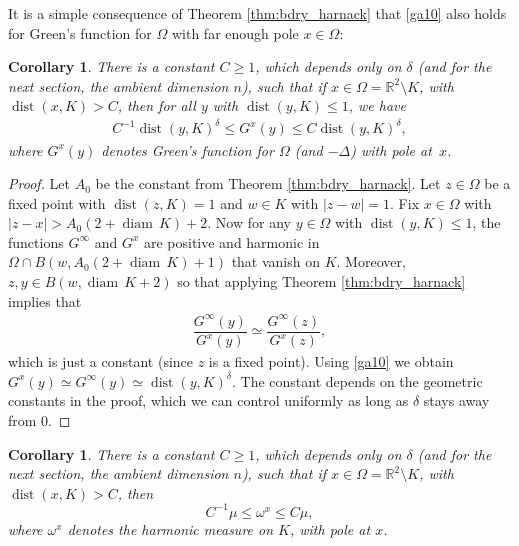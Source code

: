 \documentclass[JEP,XML,SOM,Unicode,published]{cedram}
\let\sm\setminus
\numberwithin{equation}{section}
\theoremstyle{plain}
\newtheorem{cor}[lem]{Corollary}
\theoremstyle{definition}
\newcommand{\R}{\mathbb{R}}
\let\sm\setminus
\DeclareMathOperator{\dist}{dist}
\newcommand{\R}{\mathbb{R}}
\DeclareMathOperator{\dist}{dist}
\DeclareMathOperator{\diam}{diam}
\begin{document}
It is a simple consequence of Theorem \ref{thm:bdry_harnack} that \eqref{ga10} also
holds for Green's function for $\Omega$ with far enough pole $x \in \Omega$:

\begin{cor}\label{cor:finite_pole}
There is a constant $C \geq 1$, which depends only on $\delta$
(and for the next section, the ambient dimension $n$), such that if
$x \in \Omega = \R^2 \sm K$, with $\dist(x, K) > C$, then for
all $y$ with $\dist(y,K) \le 1$, we have\vspace*{-3pt}
\begin{align*}
C^{-1} \dist(y, K)^\delta \leq G^x(y) \leq C \dist(y, K)^\delta,
\end{align*}
where $G^x(y)$ denotes Green's %
function for $\Omega$ (and $-\Delta$) with pole at~$x$.
\end{cor}

\begin{proof}
Let $A_0$ be the constant from Theorem \ref{thm:bdry_harnack}.
Let $z \in \Omega$ be a fixed point with $\dist(z, K) = 1$ and $w \in K$ with $|z- w| = 1$.
Fix $x \in \Omega$ with $|z - x| > A_0(2 + \diam \, K) + 2$.
Now for any $y \in \Omega$ with $\dist(y, K) \le 1$,
the functions $G^\infty$ and $G^x$ are positive and harmonic in $\Omega \cap B(w, A_0(2+\diam \, K) + 1)$ that vanish on $K$. Moreover, $z, y \in B(w, \diam \, K + 2)$ so that applying Theorem \ref{thm:bdry_harnack} implies that\vspace*{-3pt}
\begin{align*}
\dfrac{G^\infty(y)}{G^x(y)} \simeq \dfrac{G^\infty(z)}{G^x(z)},
\end{align*}
which is just a constant (since $z$ is a fixed point). Using \eqref{ga10} we obtain
$G^x(y) \simeq G^\infty(y) \simeq \dist(y, K)^\delta$. The constant depends on the geometric constants in the proof,
which we can control uniformly as long as $\delta$ stays away from $0$.
\end{proof}

\begin{cor}
There is a constant $C \geq 1$, which depends only on $\delta$
(and for the next section, the ambient dimension $n$), such that if
$x \in \Omega = \R^2 \sm K$, with $\dist(x, K) > C$, then\vspace*{-3pt}
\begin{equation} \label{3a14}
C^{-1} \mu \leq \omega^x \leq C \mu,
\end{equation}
where $\omega^x$ denotes the harmonic measure on $K$, with pole at $x$.
\end{cor}
\end{document}
